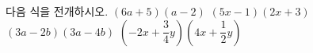 다음 식을 전개하시오.
 $(6a+5)(a-2)$
 $(5x-1)(2x+3)$
 $(3a-2b)(3a-4b)$
 $\left(-2x+\dfrac{3}{4}y\right)\left(4x+\dfrac{1}{2}y\right)$

